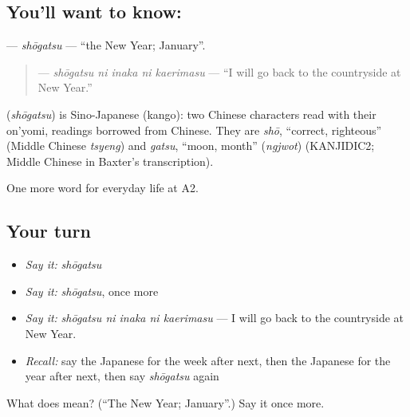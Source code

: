 \subsection*{You'll want to know: }
\textbf{} — \emph{shōgatsu} — \textquotedblleft{}the New Year; January\textquotedblright{}.

\begin{quote}
\textbf{  } — \emph{shōgatsu ni inaka ni kaerimasu} — \textquotedblleft{}I will go back to the countryside at New Year.\textquotedblright{}
\end{quote}

\begin{cousinweb}
\textbf{} (\emph{shōgatsu}) is Sino-Japanese (kango): two Chinese characters read with their on'yomi, readings borrowed from Chinese. They are \emph{shō}, \textquotedblleft{}correct, righteous\textquotedblright{} (Middle Chinese \emph{tsyeng}) and \emph{gatsu}, \textquotedblleft{}moon, month\textquotedblright{} (\emph{ngjwot}) (KANJIDIC2; Middle Chinese in Baxter's transcription).
\end{cousinweb}

\begin{grammarlens}[title={What you've built}]
One more word for everyday life at A2.
\end{grammarlens}

\subsection*{Your turn}
\begin{itemize}
\raggedright
  \item \emph{Say it:} \emph{shōgatsu}
  \item \emph{Say it:} \emph{shōgatsu}, once more
  \item \emph{Say it:} \emph{shōgatsu ni inaka ni kaerimasu} — I will go back to the countryside at New Year.
  \item \emph{Recall:} say the Japanese for the week after next, then the Japanese for the year after next, then say \emph{shōgatsu} again
\end{itemize}

\begin{tcolorbox}[breakable,colback=teal!4,colframe=teal!35!black,title={Before you move on}]
What does  mean? (\textquotedblleft{}The New Year; January\textquotedblright{}.) Say it once more.
\end{tcolorbox}
